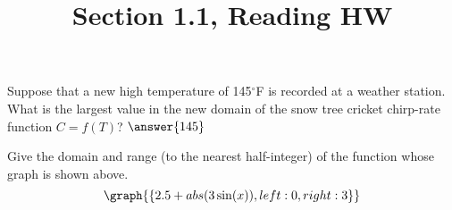 \documentclass{ximera}
\title{Section 1.1, Reading HW}
\begin{document}
\begin{abstract}
\end{abstract}
\maketitle

\begin{problem}
Suppose that a new high temperature of 145\(^\circ\)F is recorded at a weather station.  What is the largest value in the new domain of the snow tree cricket chirp-rate function \(C=f(T)\)?
    $\answer{145}$

\end{problem}

\begin{problem}
   Give the domain and range (to the nearest half-integer) of the function whose graph is shown above.
   \[
    \graph{\left\{2.5+abs(3\sin(x)),left:0, right:3\right\}}
   \]
   
\end{problem}
\end{document}
